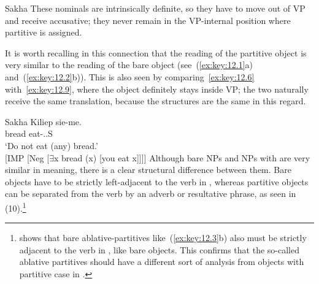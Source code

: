 \documentclass[output=paper]{langsci/langscibook}
\begin{document}
\ea\label{ex:key:12.8}Sakha
\z
These nominals are intrinsically definite, so they have to move out of VP and
receive accusative; they never remain in the VP-internal position where
partitive is assigned.

It is worth recalling in this connection that the reading of the partitive
object is very similar to the reading of the bare object (see~(\ref{ex:key:12.1}a) and~(\ref{ex:key:12.2}b)).
This is also seen by comparing~\eqref{ex:key:12.6} with~\eqref{ex:key:12.9}, where the object definitely stays
inside VP; the two naturally receive the same  translation, because the
structures are the same in this regard.

\ea\label{ex:key:12.9}Sakha
    \sn
	\gll    Kiliep  sie-me.\\
		    bread  eat-\Imp{}.\Neg{}.\Ssg{}S\\
	\glt    ‘Do not eat (any) bread.’\\
		    {}[IMP [Neg [${\exists}$x bread (x) [you eat x]]]]
\z
Although bare NPs and NPs with  are very similar in meaning,
there is a clear structural difference between them. Bare objects have to be
strictly left-adjacent to the verb in , whereas partitive objects can be
separated from the verb by an adverb or resultative phrase, as seen in
(10).\footnote{\textcite{Kornfilt1990,Kornfilt1996} shows that bare
    ablative-partitives like~(\ref{ex:key:12.3}b) also must be strictly adjacent to the verb in
    , like bare objects.  This confirms that the so-called ablative
partitives should have a different sort of analysis from objects with partitive
case in .}
\end{document}
